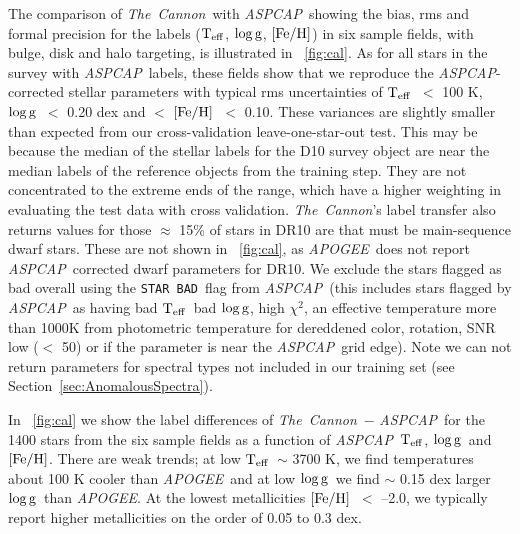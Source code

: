 \documentclass[12pt, preprint]{aastex}
\newcommand{\sectionname}{Section}
\newcommand{\tc}{\textsl{The~Cannon}}
\newcommand{\apogee}{\textsl{APOGEE}}
\newcommand{\aspcap}{\textsl{ASPCAP}}
\newcommand{\badstar}{\texttt{STAR BAD}}
\newcommand{\teff}{\mbox{$\rm T_{eff}$}}
\newcommand{\feh}{\mbox{$\rm [Fe/H]$}}
\newcommand{\logg}{\mbox{$\rm \log g$}}
\begin{document}
The comparison of \tc\ with \aspcap\, showing the bias, rms and formal precision for the labels (\teff , \logg , \feh ) in six sample fields, with bulge, disk and halo targeting, is illustrated in \figurename~\ref{fig:cal}. As for all stars in the survey with \aspcap\ labels, these fields show that we reproduce the \aspcap-corrected stellar parameters with typical rms uncertainties of \teff\ $<$ 100 K, \logg\ $<$ 0.20 dex and $<$ \feh\ $<$ 0.10. These variances are slightly smaller than expected from our cross-validation leave-one-star-out test. This may be because the median of the stellar labels for the D10 survey object are near the median labels of the reference objects from the training step. 
They are not concentrated to the extreme ends of the range, which have a higher weighting in evaluating the test data with cross validation. 
 \tc 's label transfer also returns values for those $\approx$ 15\% of stars in DR10 are that must be main-sequence dwarf stars. 
These are not shown in \figurename~\ref{fig:cal}, as \apogee\ does not report \aspcap\ corrected dwarf parameters for DR10. 
We exclude the stars flagged as bad overall  using the \badstar\ flag from \aspcap\ (this includes stars flagged by \aspcap\ as having bad \teff\, bad \logg, high $\chi^2$, an effective temperature more than 1000K from photometric temperature for dereddened color, rotation, SNR low ($<$ 50) or if the parameter is near the \aspcap\ grid edge).  Note we can not return parameters for spectral types not included in our training set (see \sectionname~\ref{sec:AnomalousSpectra}). 

In \figurename~\ref{fig:cal} we show the label differences of \tc\ $-$ \aspcap\ for the 1400 stars from the six sample fields as a function of \aspcap\ \teff, \logg\ and \feh. There are weak trends; at low \teff\ $\sim$ 3700 K, we find temperatures about 100 K cooler than \apogee\ and at low \logg\ we find $\sim$ 0.15 dex larger \logg\ than \apogee. At the lowest metallicities \feh\ $<$ --2.0, we typically report higher metallicities on the order of 0.05 to 0.3 dex.
\end{document}
